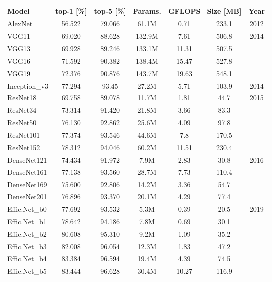 \begin{table}[ht]
    \centering
    \begin{tabular}{l|c|c|c|c|c|c}
        \hline
        \textbf{Model} & \textbf{top-1 [\%]} & \textbf{top-5 [\%]} & 
        \textbf{Params.} & \textbf{GFLOPS} & \textbf{Size [MB]} & 
        \textbf{Year} \\
        \hline
        \hline
        AlexNet & 56.522 & 79.066 & 61.1M & 0.71 & 233.1 & 2012 \\
        \hline
        VGG11 & 69.020 & 88.628 & 132.9M & 7.61 & 506.8 & 2014 \\
        VGG13 & 69.928 & 89.246 & 133.1M & 11.31 & 507.5 & \\
        VGG16 & 71.592 & 90.382 & 138.4M & 15.47 & 527.8 & \\
        VGG19 & 72.376 & 90.876 & 143.7M & 19.63 & 548.1 & \\
        \hline
        Inception\_v3 & 77.294 & 93.45 & 27.2M & 5.71 & 103.9 & 2014 \\
        \hline
        ResNet18 & 69.758 & 89.078 & 11.7M & 1.81 & 44.7 & 2015 \\
        ResNet34 & 73.314 & 91.420 & 21.8M & 3.66 & 83.3 & \\
        ResNet50 & 76.130 & 92.862 & 25.6M & 4.09 & 97.8 & \\
        ResNet101 & 77.374 & 93.546 & 44.6M & 7.8 & 170.5 & \\
        ResNet152 & 78.312 & 94.046 & 60.2M & 11.51 & 230.4 & \\
        \hline
        DenseNet121 & 74.434 & 91.972 & 7.9M & 2.83 & 30.8 & 2016 \\
        DenseNet161 & 77.138 & 93.560 & 28.7M & 7.73 & 110.4 & \\
        DenseNet169 & 75.600 & 92.806 & 14.2M & 3.36 & 54.7 & \\
        DenseNet201 & 76.896 & 93.370 & 20.1M & 4.29 & 77.4 & \\
        \hline
        Effic.Net\_b0 & 77.692 & 93.532 & 5.3M & 0.39 & 20.5 & 2019 \\
        Effic.Net\_b1 & 78.642 & 94.186 & 7.8M & 0.69 & 30.1 & \\
        Effic.Net\_b2 & 80.608 & 95.310 & 9.2M & 1.09 & 35.2 & \\
        Effic.Net\_b3 & 82.008 & 96.054 & 12.3M & 1.83 & 47.2 & \\
        Effic.Net\_b4 & 83.384 & 96.594 & 19.4M & 4.39 & 74.5 & \\
        Effic.Net\_b5 & 83.444 & 96.628 & 30.4M & 10.27 & 116.9 & \\

\end{tabular}
\end{table}
